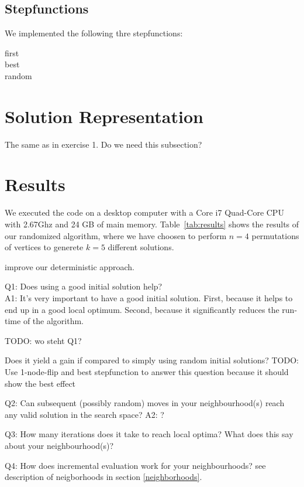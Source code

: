 \documentclass{scrartcl}
\begin{document}
\subsection{Stepfunctions}

We implemented the following thre stepfunctions:

\begin{description}
\item[first] 
\item[best] 
\item[random] 
\end{description}



\section{Solution Representation}
The same as in exercise 1. Do we need this subsection?

\section{Results}
We executed the code on a desktop computer with a Core i7 Quad-Core
CPU with 2.67Ghz and 24 GB of main memory. Table~\ref{tab:results}
shows the results of our randomized algorithm, where we have choosen
to perform $n=4$ permutations of vertices to generete $k=5$ different
solutions.


improve our deterministic approach.

Q1: Does using a good initial solution help? \\
A1: It's very important to have a good initial solution. First, because it helps to end up
in a good local optimum. Second, because it significantly reduces the run-time of the algorithm.

TODO: wo steht Q1?

Does it yield a gain if compared to simply using random initial solutions?
TODO: Use 1-node-flip and best stepfunction to answer this question because it should show the best effect


Q2: Can subsequent (possibly random) moves in your neighbourhood(s) reach
any valid solution in the search space?
A2: ?

Q3: How many iterations does it take to reach local optima? What does this say about your neighbourhood(s)?

Q4: How does incremental evaluation work for your neighbourhoods?
see description of neigborhoods in section \ref{neighborhoods}.
\end{document}
